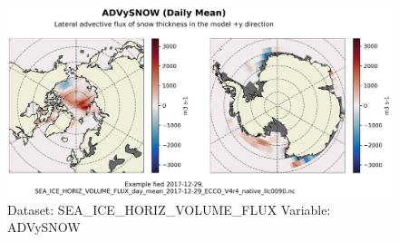 \begin{figure}[H]
\centering
\includegraphics[width=\textwidth]{../images/plots/native_plots/Sea-Ice_and_Snow_Horizontal_Volume_Fluxes/ADVySNOW.png}
\caption{Dataset: SEA\_ICE\_HORIZ\_VOLUME\_FLUX Variable: ADVySNOW}
\label{tab:table-SEA_ICE_HORIZ_VOLUME_FLUX_ADVySNOW-Plot}
\end{figure}
\pagebreak
